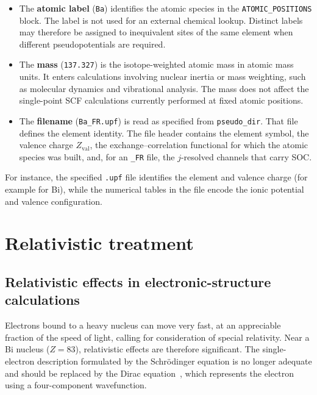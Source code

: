 \documentclass[11pt]{article}
\begin{document}
\begin{itemize}[leftmargin=1.4em,itemsep=2pt]
\item The \textbf{atomic label} (\texttt{Ba}) identifies the atomic species in the
\texttt{ATOMIC\_POSITIONS} block. The label is not used for an external chemical lookup. Distinct labels may
therefore be assigned to inequivalent sites of the same element when different pseudopotentials are
required.
\item The \textbf{mass} (\texttt{137.327}) is the isotope-weighted atomic mass in atomic mass units.
It enters calculations involving nuclear inertia or mass weighting, such as molecular dynamics and
vibrational analysis. The mass does not affect the single-point SCF calculations currently performed at fixed atomic
positions.
\item The \textbf{filename} (\texttt{Ba\_FR.upf}) is read as specified from \texttt{pseudo\_dir}. That
file defines the element identity. The file header contains the element symbol, the valence
charge $Z_{\text{val}}$, the exchange--correlation functional for which the atomic species was built, and, for an
\texttt{\_FR} file, the $j$-resolved channels that carry SOC.
\end{itemize}

\noindent For instance, the specified \texttt{.upf} file identifies the element and valence charge
(for example  for Bi), while the numerical tables in the file encode the
ionic potential and valence configuration.

\section{Relativistic treatment}\label{sec:rel}

\subsection{Relativistic effects in electronic-structure calculations}

Electrons bound to a heavy nucleus can move very fast, at an appreciable fraction of the speed of
light, calling for consideration of special relativity. Near a Bi nucleus ($Z=83$), relativistic
effects are therefore significant. The single-electron description formulated by the Schr\"odinger
equation is no longer adequate and should be replaced by the Dirac equation~\cite{dirac1928}, which
represents the electron using a four-component wavefunction.
\end{document}
